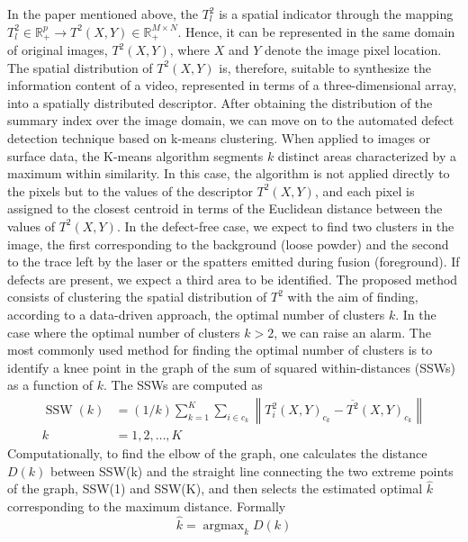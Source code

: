 In the paper mentioned above, the $T_l^2$ is a spatial indicator through the mapping $T_l^2 \in \mathbb{R}_{+}^p \rightarrow T^2(X, Y) \in \mathbb{R}_{+}^{M \times N}$. Hence, it can be represented in the same domain of original images, $T^2(X, Y)$, where $X$ and $Y$ denote the image pixel location. The spatial distribution of $T^2(X, Y)$ is, therefore, suitable to synthesize the information content of a video, represented in terms of a three-dimensional array, into a spatially distributed descriptor. After obtaining the distribution of the summary index over the image domain, we can move on to the automated defect detection technique based on k-means clustering. When applied to images or surface data, the K-means algorithm segments $k$ distinct areas characterized by a maximum within similarity. In this case, the algorithm is not applied directly to the pixels but to the values of the descriptor $T^2(X, Y)$, and each pixel is assigned to the closest centroid in terms of the Euclidean distance between the values of $T^2(X, Y)$. In the defect-free case, we expect to find two clusters in the image, the first corresponding to the background (loose powder) and the second to the trace left by the laser or the spatters emitted during fusion (foreground). If defects are present, we expect a third area to be identified. The proposed method consists of clustering the spatial distribution of $T^2$ with the aim of finding, according to a data-driven approach, the optimal number of clusters $k$. In the case where the optimal number of clusters $k>2$, we can raise an alarm. The most commonly used method for finding the optimal number of clusters is to identify a knee point in the graph of the sum of squared within-distances (SSWs) as a function of $k$. The SSWs are computed as 
\begin{equation}
\begin{aligned}
\operatorname{SSW}(k) & =(1 / k) \sum_{k=1}^K \sum_{i \in c_k}\left\|T_i^2(X, Y)_{c_k}-\overline{T^2}(X, Y)_{c_k}\right\| \\
k & =1,2, \ldots, K
\end{aligned}
\end{equation}
Computationally, to find the elbow of the graph, one calculates the distance $D(k)$ between SSW(k) and the straight line connecting the two extreme points of the graph, SSW(1) and SSW(K), and then selects the estimated optimal $\hat{k}$ corresponding to the maximum distance. Formally
\begin{equation}
\hat{k}=\operatorname{argmax}_k D(k)
\end{equation}
